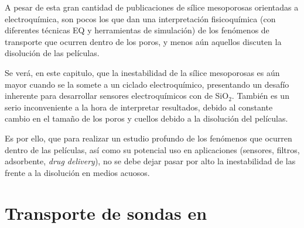 	A pesar de esta gran cantidad de publicaciones de sílice mesoporosas orientadas a electroquímica, son pocos los que dan una interpretación fisicoquímica (con diferentes técnicas EQ y herramientas de simulación) de los fenómenos de transporte que ocurren dentro de los poros, y menos aún aquellos discuten la disolución de las películas. 

	Se verá, en este capitulo, que la inestabilidad de la sílice mesoporosas es aún mayor cuando se la somete a un ciclado electroquímico, presentando un desafío inherente para desarrollar sensores electroquímicos con \pdm\space de SiO$_2$. También es un serio inconveniente a la hora de interpretar resultados, debido al constante cambio en el tamaño de los poros y cuellos debido a la disolución del películas. 

	Es por ello, que para realizar un estudio profundo de los fenómenos que ocurren dentro de las películas, así como su potencial uso en aplicaciones (sensores, filtros, adsorbente, \textit{drug delivery}), no se debe dejar pasar por alto la inestabilidad de las \pdm\space frente a la disolución en medios acuosos.
	


	
				

\section{Transporte de sondas en \pdm}

